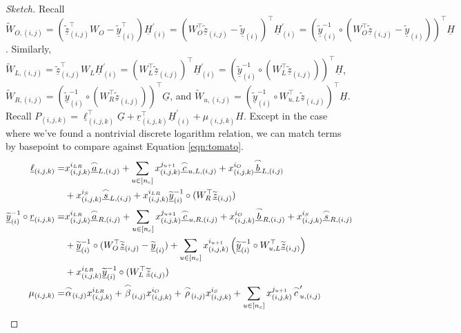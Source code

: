 \documentclass{article}
\theoremstyle{definition}
\newcommand{\zq}{\widetilde{\underline{z}}}
\newcommand{\yq}{\widetilde{\underline{y}}}
\begin{document}
\begin{proof}[Sketch]
Recall $\widetilde{W}_{O,(i,j)} = (\zq_{(i,j)}^\top W_O - \yq_{(i)}^\top)\underline{H}^\prime_{(i)} = (W_O^\top \zq_{(i,j)} - \yq_{(i)})^\top \underline{H}_{(i)}^\prime = (\yq_{(i)}^{-1} \circ (W_O^\top \zq_{(i,j)} - \yq_{(i)}))^\top \underline{H}$. 
Similarly, $\widetilde{W}_{L,(i,j)} = \zq_{(i,j)}^\top W_L \underline{H}_{(i)}^\prime = (W_L^\top \zq_{(i,j)})^\top \underline{H}^\prime_{(i)} = (\yq_{(i)}^{-1} \circ (W_L^\top \zq_{(i,j)}))^\top \underline{H}$, 
 $\widetilde{W}_{R,(i,j)} = (\yq_{(i)}^{-1} \circ (W_R^\top \zq_{(i,j)}))^\top \underline{G}$, and $\widetilde{W}_{u, (i,j)} = (\yq_{(i)}^{-1} \circ W_{u,L}^\top \zq_{(i,j)})^\top\underline{H}$. 
Recall $P_{(i,j,k)} = \underline{\ell}_{(i,j,k)}^\top \underline{G} + \underline{r}_{(i,j,k)}^\top \underline{H}^\prime_{(i)} + \mu_{(i,j,k)}H$. Except in the case where we've found a nontrivial discrete logarithm relation, we can match terms by basepoint to compare against Equation \ref{eqn:tomato}.
\begin{align*}
\underline{\ell}_{(i,j,k)} =& x^{i_{LR}}_{(i,j,k)}\underline{\overset{\LARGE \frown}{\small{a}}}_{L, (i,j)} + \sum_{u \in [n_c]} x^{j_{u+1}}_{(i,j,k)} \underline{\overset{\LARGE \frown}{\small{c}}}_{u,L, (i,j)} + x^{i_O}_{(i,j,k)}\underline{\overset{\LARGE \frown}{\small{b}}}_{L, (i,j)} \\& + x^{i_S}_{(i,j,k)} \underline{\overset{\LARGE \frown}{\small{s}}}_{L, (i,j)} + x_{(i,j,k)}^{i_{LR}}\yq_{(i)}^{-1} \circ (W_R^\top \zq_{(i,j)})\\
\yq^{-1}_{(i)} \circ \underline{r}_{(i,j,k)} =& x^{i_{LR}}_{(i,j,k)}\underline{\overset{\LARGE \frown}{\small{a}}}_{R, (i,j)} + \sum_{u \in [n_c]} x^{j_{u+1}}_{(i,j,k)} \underline{\overset{\LARGE \frown}{\small{c}}}_{u,R, (i,j)} +  x^{i_O}_{(i,j,k)}\underline{\overset{\LARGE \frown}{\small{b}}}_{R, (i,j)} + x^{i_S}_{(i,j,k)} \underline{\overset{\LARGE \frown}{\small{s}}}_{R, (i,j)} \\
& + \yq_{(i)}^{-1} \circ (W_O^\top \zq_{(i,j)} - \yq_{(i)}) + \sum_{u \in [n_c]} x_{(i,j,k)}^{i_{u+1}} \left(\yq_{(i)}^{-1} \circ W_{u,L}^\top \zq_{(i,j)}\right)  \\
& + x^{i_{LR}}_{(i,j,k)} \yq_{(i)}^{-1} \circ (W_L^\top \zq_{(i,j)})   \\
\mu_{(i,j,k)} =& \overset{\LARGE \frown}{\small{\alpha}}_{(i,j)}x_{(i,j,k)}^{i_{LR}} + \overset{\LARGE \frown}{\small{\beta}}_{(i,j)}x_{(i,j,k)}^{i_O} + \overset{\LARGE \frown}{\small{\rho}}_{(i,j)}x_{(i,j,k)}^{i_S}+\sum_{u \in [n_c]} x_{(i,j,k)}^{j_{u+1}} \overset{\LARGE \frown}{\small{c}}^\prime_{u,(i,j)}
\end{align*}





\end{proof}
\end{document}
